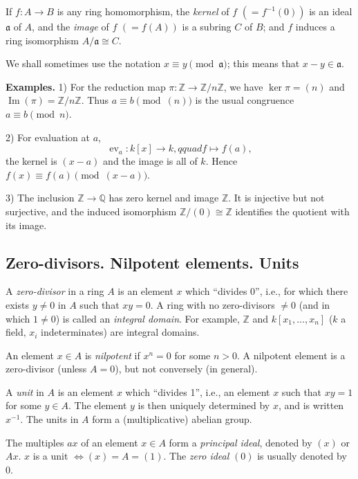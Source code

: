 If $f:A\longrightarrow B$ is any ring homomorphism, the \emph{kernel} of $f$ $(=f^{-1}(0))$ is an ideal
$\mathfrak a$ of $A$, and the \emph{image} of $f$ $(=f(A))$ is a subring $C$ of $B$; and $f$ induces a ring
isomorphism $A/\mathfrak a\cong C$.

We shall sometimes use the notation $x\equiv y\pmod{\mathfrak a}$; this means that
$x-y\in\mathfrak a$.

\textline
\noindent\textbf{Examples.} 1) For the reduction map
$\pi:\mathbb Z\longrightarrow\mathbb Z/n\mathbb Z$, we have
$\ker\pi=(n)$ and $\operatorname{Im}(\pi)=\mathbb Z/n\mathbb Z$.  Thus
$a\equiv b\pmod{(n)}$ is the usual congruence $a\equiv b\pmod n$.

2) For evaluation at $a$,
\[
\operatorname{ev}_a:k[x]\longrightarrow k,qquad f\longmapsto f(a),
\]
the kernel is $(x-a)$ and the image is all of $k$.  Hence
$f(x)\equiv f(a)\pmod{(x-a)}$.

3) The inclusion $\mathbb Z\longrightarrow\mathbb Q$ has zero kernel and image
$\mathbb Z$.  It is injective but not surjective, and the induced isomorphism
$\mathbb Z/(0)\cong\mathbb Z$ identifies the quotient with its image.
\textline

\subsection{Zero-divisors. Nilpotent elements. Units}

A \emph{zero-divisor} in a ring $A$ is an element $x$ which ``divides 0'', i.e., for which there
exists $y\ne0$ in $A$ such that $xy=0$.  A ring with no zero-divisors $\ne0$ (and in
which $1\ne0$) is called an \emph{integral domain}.  For example, $\mathbb Z$ and $k[x_1,\ldots,x_n]$
($k$ a field, $x_i$ indeterminates) are integral domains.

An element $x\in A$ is \emph{nilpotent} if $x^n=0$ for some $n>0$.  A nilpotent
element is a zero-divisor (unless $A=0$), but not conversely (in general).

A \emph{unit} in $A$ is an element $x$ which ``divides 1'', i.e., an element $x$ such that
$xy=1$ for some $y\in A$.  The element $y$ is then uniquely determined by $x$, and is
written $x^{-1}$.  The units in $A$ form a (multiplicative) abelian group.

The multiples $ax$ of an element $x\in A$ form a \emph{principal ideal}, denoted by $(x)$
or $Ax$.  $x$ is a unit $\Longleftrightarrow (x)=A=(1)$.  The \emph{zero ideal} $(0)$ is usually denoted by 0.

